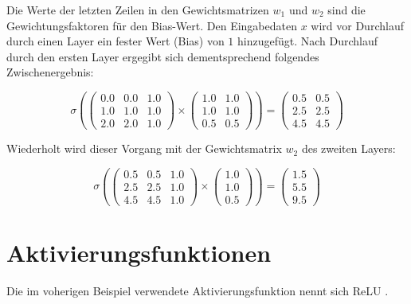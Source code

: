 Die Werte der letzten Zeilen in den Gewichtsmatrizen $ w_{1} $ und $ w_{2} $ sind die Gewichtungsfaktoren für den Bias-Wert. Den Eingabedaten $ x $ wird vor Durchlauf durch einen Layer ein fester Wert (Bias) von $ 1 $ hinzugefügt. Nach Durchlauf durch den ersten Layer ergegibt sich dementsprechend folgendes Zwischenergebnis:

\begin{equation}
	\sigma \left(
	\begin{pmatrix} 
		0.0 & 0.0 & 1.0 \\
		1.0 & 1.0 & 1.0 \\ 
		2.0 & 2.0 & 1.0
	\end{pmatrix} 
	\times
	\begin{pmatrix} 
		1.0 & 1.0 \\
		1.0 & 1.0 \\ 
		0.5 & 0.5
	\end{pmatrix}
	\right)
	= 
	\begin{pmatrix} 
		0.5 & 0.5 \\
		2.5 & 2.5 \\ 
		4.5 & 4.5
	\end{pmatrix}
\end{equation}

Wiederholt wird dieser Vorgang mit der Gewichtsmatrix $ w_{2} $ des zweiten Layers:

\begin{equation}
	\sigma \left(
	\begin{pmatrix} 
		0.5 & 0.5 & 1.0 \\
		2.5 & 2.5 & 1.0 \\ 
		4.5 & 4.5 & 1.0
	\end{pmatrix}
	\times
	\begin{pmatrix} 
		1.0 \\
		1.0 \\ 
		0.5
	\end{pmatrix}
	\right)
	= 
	\begin{pmatrix} 
		1.5 \\
		5.5 \\ 
		9.5
	\end{pmatrix}
\end{equation}

\section{Aktivierungsfunktionen}
\label{sec:activation_functions}

Die im voherigen Beispiel verwendete Aktivierungsfunktion nennt sich ReLU \cite{Nair:2010:RLU:3104322.3104425}.

